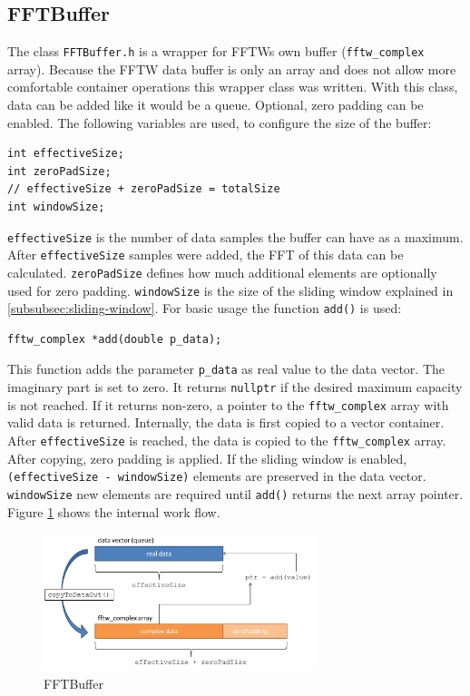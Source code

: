 \documentclass[notitlepage]{scrreprt}
\begin{document}
\subsection{FFTBuffer}
\label{subsec:fft-buffer}
The class \lstinline{FFTBuffer.h} is a wrapper for FFTWs own buffer (\lstinline{fftw_complex} array). Because the FFTW data buffer is only an array and does not allow more comfortable container operations this wrapper class was written. With this class, data can be added like it would be a queue. Optional, zero padding can be enabled. The following variables are used, to configure the size of the buffer:

\begin{lstlisting}
int effectiveSize;
int zeroPadSize;
// effectiveSize + zeroPadSize = totalSize
int windowSize;
\end{lstlisting}

\lstinline{effectiveSize} is the number of data samples the buffer can have as a maximum. After \lstinline{effectiveSize} samples were added, the FFT of this data can be calculated. \lstinline{zeroPadSize} defines how much additional elements are optionally used for zero padding. \lstinline{windowSize} is the size of the sliding window explained in \ref{subsubsec:sliding-window}. For basic usage the function \lstinline{add()} is used:

\begin{lstlisting}
fftw_complex *add(double p_data);
\end{lstlisting}

This function adds the parameter \lstinline{p_data} as real value to the data vector. The imaginary part is set to zero. It returns \lstinline{nullptr} if the desired maximum capacity is not reached. If it returns non-zero, a pointer to the \lstinline{fftw_complex} array with valid data is returned. Internally, the data is first copied to a vector container. After \lstinline{effectiveSize} is reached, the data is copied to the \lstinline{fftw_complex} array. After copying, zero padding is applied. If the sliding window is enabled, \lstinline{(effectiveSize - windowSize)} elements are preserved in the data vector. \lstinline{windowSize} new elements are required until \lstinline{add()} returns the next array pointer. Figure \ref{fig:fft-buffer} shows the internal work flow.

\begin{figure}[H]
	\centering
	\includegraphics[width=300px]{images/FFTBuffer.png}
	\caption{FFTBuffer}
	\label{fig:fft-buffer}
\end{figure}
\end{document}
